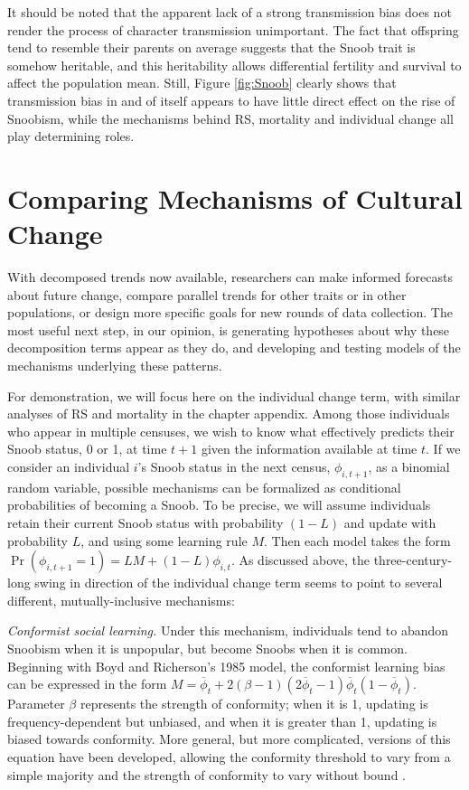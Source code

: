 It should be noted that the apparent lack of a strong transmission bias does not render the process of character transmission unimportant. The fact that offspring tend to resemble their parents on average suggests that the Snoob trait is somehow heritable, and this heritability allows differential fertility and survival to affect the population mean. Still, Figure \ref{fig:Snoob} clearly shows that transmission bias in and of itself appears to have little direct effect on the rise of Snoobism, while the mechanisms behind RS, mortality and individual change all play determining roles.  


\section{Comparing Mechanisms of Cultural Change}

With decomposed trends now available, researchers can make informed forecasts about future change, compare parallel trends for other traits or in other populations, or design more specific goals for new rounds of data collection.  The most useful next step, in our opinion, is generating hypotheses about why these decomposition terms appear as they do, and developing and testing models of the mechanisms underlying these patterns.

For demonstration, we will focus here on the individual change term, with similar analyses of RS and mortality in the chapter appendix.  Among those individuals who appear in multiple censuses, we wish to know what effectively predicts their Snoob status, 0 or 1, at time $t+1$ given the information available at time $t$.  If we consider an individual $i$'s Snoob status in the next census, $\phi_{i,t+1}$, as a binomial random variable, possible mechanisms can be formalized as  conditional probabilities of becoming a Snoob.  To be precise, we will assume individuals retain their current Snoob status with probability $(1-L)$ and update with probability $L$, and using some learning rule $M$.  Then each model takes the form $\Pr(\phi_{i,t+1}=1) = LM + (1-L)\phi_{i,t}$.  As discussed above, the three-century-long swing in direction of the individual change term seems to point to several different, mutually-inclusive mechanisms: 

\textit{Conformist social learning.}  Under this mechanism, individuals tend to abandon Snoobism when it is unpopular, but become Snoobs when it is common.  Beginning with Boyd and Richerson's 1985 model, the conformist learning bias can be expressed in the form $M = \overline{\phi}_t + 2(\beta-1)(2\overline{\phi}_t - 1)\overline{\phi}_t(1-\overline{\phi}_t)$. Parameter $\beta$ represents the strength of conformity; when it is 1, updating is frequency-dependent but unbiased, and when it is greater than 1, updating is biased towards conformity.  More general, but more complicated, versions of this equation have been developed, allowing the conformity threshold to vary from a simple majority \citep{bowles2006microeconomics} and the strength of conformity to vary without bound \citep{mcelreath2008beyond}. 
 
